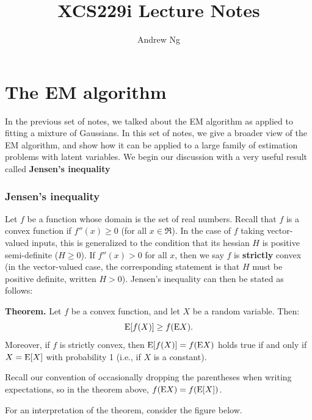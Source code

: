 \documentclass{article}
\begin{document}
\title{XCS229i Lecture Notes}
\author{Andrew Ng}
\date{}
\maketitle



\setcounter{part}{8}
\part{The EM algorithm}

In the previous set of notes, we talked about the EM algorithm
as applied to fitting a mixture of Gaussians.  In this set of notes,
we give a broader view of the EM algorithm, and show how it can
be applied to a large family of estimation problems
with latent variables.  We begin our discussion with a very useful result
called {\bf Jensen's inequality}


\section{Jensen's inequality}

Let $f$ be a function whose domain is the set of real numbers.
Recall that $f$ is a convex function if $f''(x) \geq 0$ (for all $x \in \Re$).
In the case of $f$ taking vector-valued inputs, this is generalized to
the condition that its hessian $H$ is positive semi-definite ($H \geq 0$).
If $f''(x) > 0$ for all $x$, then we say $f$ is {\bf strictly} convex
(in the vector-valued case, the corresponding statement is that $H$ must
be positive definite, written $H > 0$).  Jensen's inequality
can then be stated as follows:

\medskip
\noindent
{\bf Theorem.} Let $f$ be a convex function, and let $X$ be a random variable.
Then:
\[
{\rm E}[f(X)] \geq f({\rm E} X).
\]
Moreover, if $f$ is strictly convex, then
${\rm E}[f(X)] = f({\rm E} X)$ holds true if and only if $X = {\rm E}[X]$ with
probability 1 (i.e., if $X$ is a constant).
\medskip

Recall our convention of occasionally dropping the parentheses when
writing expectations, so in the theorem above, $f({\rm E} X) = f({\rm E}[X])$.

For an interpretation of the theorem, consider the figure below.
\end{document}
